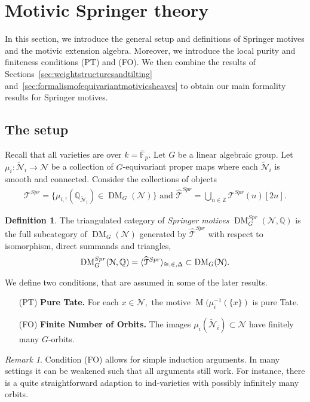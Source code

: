 \documentclass{amsart}
\theoremstyle{plain}
\theoremstyle{TheoremNum}
\theoremstyle{definition}
\newtheorem{definition}[theorem]{Definition}
\theoremstyle{remark}
\newtheorem{remark}[theorem]{Remark}
\numberwithin{equation}{section}
\newcommand{\F}{\mathbb{F}}
\newcommand{\Q}{\mathbb{Q}}
\newcommand{\Z}{\mathbb{Z}}
\newcommand{\M}{\widetilde{\mathcal{N}}}
\newcommand{\N}{\mathcal{N}}
\newcommand{\Tt}{\mathcal{T}}
\newcommand{\Mot}{\operatorname{M}}
\newcommand{\DM}{\operatorname{DM}}
\begin{document}
\section{Motivic Springer theory}\label{sec:motivicspringertheory}
In this section, we introduce the general setup and definitions of Springer motives and the motivic extension algebra. Moreover, we introduce the local purity and finiteness conditions (PT) and (FO).
We then combine the results of Sections~\ref{sec:weightstructuresandtilting} and~\ref{sec:formalismofequivariantmotivicsheaves} to obtain our main formality results for Springer motives.
\subsection{The setup}\label{sec:generalsetup}
Recall that all varieties are over $k=\overline{\F}_p.$
Let $G$ be a linear algebraic group. Let $\mu_i: \widetilde{\mathcal{N}}_i\to \N$ be a collection of $G$-equivariant proper maps where each $\M_i$ is smooth and connected.
Consider the collections of objects
\begin{align*}
    \Tt^{Spr}=\{\mu_{i,!}(\Q_{\M_i})\in \DM_G(\N)\} \text{ and }
    \widehat{\Tt}^{Spr}=\bigcup_{n\in \Z}\Tt^{Spr}(n)[2n].
\end{align*}
\begin{definition}\label{def:springermotives}
The triangulated category of \emph{Springer motives} $\DM^{Spr}_G(\N,\Q)$ is the full subcategory of $\DM_G(\N)$ generated by $\widehat{\Tt}^{Spr}$
with respect to isomorphism, direct summands and triangles,
$$\DM^{Spr}_G(\N,\Q)=\langle\widehat{\Tt}^{Spr}\rangle_{\cong, \inplus,\Delta}\subset \DM_G(\N).$$
\end{definition}
We define two conditions, that are assumed in some of the later results.
\begin{enumerate}
    \item[(PT)] \textbf{Pure Tate.} For each $x\in \N,$ the motive $\Mot(\mu_i^{-1}(\{x\})$ is pure Tate.
    \item[(FO)] \textbf{Finite Number of Orbits.} The images $\mu_i(\M_i)\subset \N$ have finitely many $G$-orbits.
\end{enumerate}
\begin{remark}
Condition (FO) allows for simple induction arguments. In many settings it can be weakened such that all arguments still work. For instance, there is a quite straightforward adaption to ind-varieties with possibly infinitely many orbits.
\end{remark}
\end{document}
